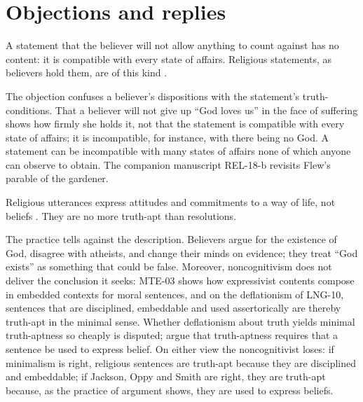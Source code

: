 \documentclass{situationist-preprint}
\begin{document}
\section{Objections and replies}

\begin{objection}[Falsification]
A statement that the believer will not allow anything to count against has no content: it is compatible with every state of affairs. Religious statements, as believers hold them, are of this kind \citep{Flew1955}.
\end{objection}

\begin{reply}
The objection confuses a believer's dispositions with the statement's truth-conditions. That a believer will not give up \enquote{God loves us} in the face of suffering shows how firmly she holds it, not that the statement is compatible with every state of affairs; it is incompatible, for instance, with there being no God. A statement can be incompatible with many states of affairs none of which anyone can observe to obtain. The companion manuscript REL-18-b revisits Flew's parable of the gardener.
\end{reply}

\begin{objection}[Noncognitivism]
Religious utterances express attitudes and commitments to a way of life, not beliefs \citep{Braithwaite1955}. They are no more truth-apt than resolutions.
\end{objection}

\begin{reply}
The practice tells against the description. Believers argue for the existence of God, disagree with atheists, and change their minds on evidence; they treat \enquote{God exists} as something that could be false. Moreover, noncognitivism does not deliver the conclusion it seeks: MTE-03 shows how expressivist contents compose in embedded contexts for moral sentences, and on the deflationism of LNG-10, sentences that are disciplined, embeddable and used assertorically are thereby truth-apt in the minimal sense. Whether deflationism about truth yields minimal truth-aptness so cheaply is disputed; \citet{JacksonOppySmith1994} argue that truth-aptness requires that a sentence be used to express belief. On either view the noncognitivist loses: if minimalism is right, religious sentences are truth-apt because they are disciplined and embeddable; if Jackson, Oppy and Smith are right, they are truth-apt because, as the practice of argument shows, they are used to express beliefs.
\end{reply}
\end{document}
